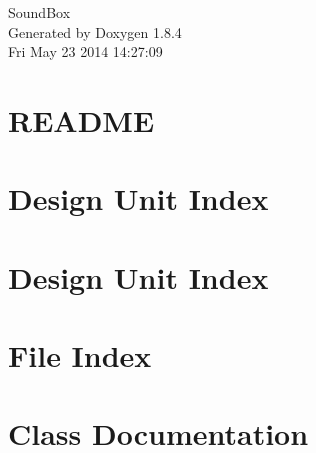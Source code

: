 \documentclass[twoside]{book}
\newcommand{\clearemptydoublepage}{%
  \newpage{\pagestyle{empty}\cleardoublepage}%
}
\begin{document}
\hypersetup{pageanchor=false}
\begin{titlepage}
\vspace*{7cm}
\begin{center}%
{\Large Sound\-Box }\\
\vspace*{1cm}
{\large Generated by Doxygen 1.8.4}\\
\vspace*{0.5cm}
{\small Fri May 23 2014 14:27:09}\\
\end{center}
\end{titlepage}
\clearemptydoublepage
\tableofcontents
\clearemptydoublepage
{}
\hypersetup{pageanchor=true}

\chapter{R\-E\-A\-D\-M\-E}
\label{md_README}
\hypertarget{md_README}{}

\chapter{Design Unit Index}

\chapter{Design Unit Index}

\chapter{File Index}

\chapter{Class Documentation}































\end{document}
